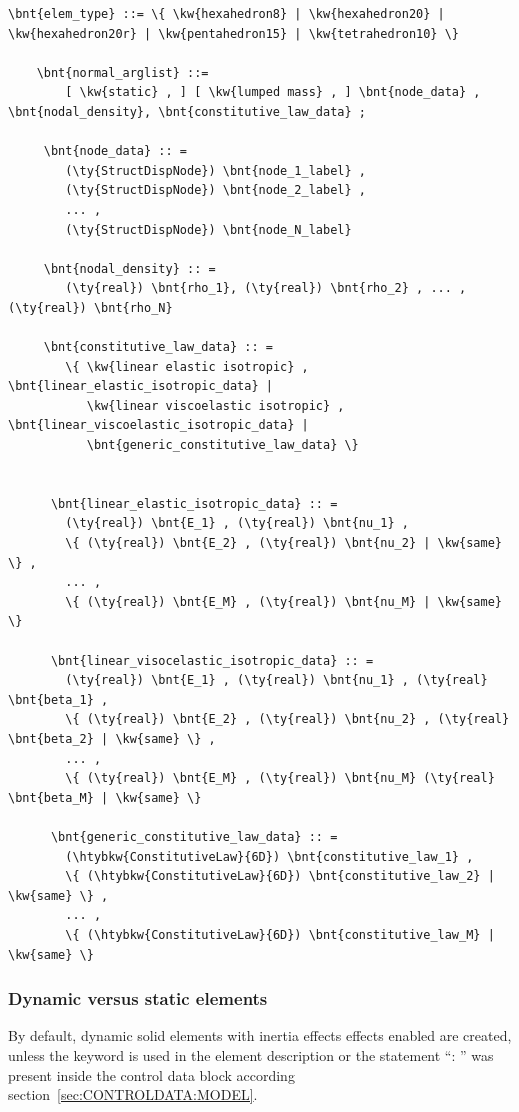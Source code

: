 \begin{Verbatim}[commandchars=\\\{\}]
    \bnt{elem_type} ::= \{ \kw{hexahedron8} | \kw{hexahedron20} | \kw{hexahedron20r} | \kw{pentahedron15} | \kw{tetrahedron10} \}

    \bnt{normal_arglist} ::=
        [ \kw{static} , ] [ \kw{lumped mass} , ] \bnt{node_data} , \bnt{nodal_density}, \bnt{constitutive_law_data} ;

     \bnt{node_data} :: =
        (\ty{StructDispNode}) \bnt{node_1_label} ,
        (\ty{StructDispNode}) \bnt{node_2_label} ,
        ... ,
        (\ty{StructDispNode}) \bnt{node_N_label}

     \bnt{nodal_density} :: =
        (\ty{real}) \bnt{rho_1}, (\ty{real}) \bnt{rho_2} , ... , (\ty{real}) \bnt{rho_N}

     \bnt{constitutive_law_data} :: =
        \{ \kw{linear elastic isotropic} , \bnt{linear_elastic_isotropic_data} |
           \kw{linear viscoelastic isotropic} , \bnt{linear_viscoelastic_isotropic_data} |
           \bnt{generic_constitutive_law_data} \}


      \bnt{linear_elastic_isotropic_data} :: =
        (\ty{real}) \bnt{E_1} , (\ty{real}) \bnt{nu_1} ,
        \{ (\ty{real}) \bnt{E_2} , (\ty{real}) \bnt{nu_2} | \kw{same} \} ,
        ... ,
        \{ (\ty{real}) \bnt{E_M} , (\ty{real}) \bnt{nu_M} | \kw{same} \}

      \bnt{linear_visocelastic_isotropic_data} :: =
        (\ty{real}) \bnt{E_1} , (\ty{real}) \bnt{nu_1} , (\ty{real} \bnt{beta_1} ,
        \{ (\ty{real}) \bnt{E_2} , (\ty{real}) \bnt{nu_2} , (\ty{real} \bnt{beta_2} | \kw{same} \} ,
        ... ,
        \{ (\ty{real}) \bnt{E_M} , (\ty{real}) \bnt{nu_M} (\ty{real} \bnt{beta_M} | \kw{same} \}

      \bnt{generic_constitutive_law_data} :: =
        (\htybkw{ConstitutiveLaw}{6D}) \bnt{constitutive_law_1} ,
        \{ (\htybkw{ConstitutiveLaw}{6D}) \bnt{constitutive_law_2} | \kw{same} \} ,
        ... ,
        \{ (\htybkw{ConstitutiveLaw}{6D}) \bnt{constitutive_law_M} | \kw{same} \}
\end{Verbatim}

\subsubsection{Dynamic versus static elements}
By default, dynamic solid elements with inertia effects effects enabled are created,
unless the keyword  is used in the element description
or the statement ``: '' was present inside the control data block according section~\ref{sec:CONTROLDATA:MODEL}.
